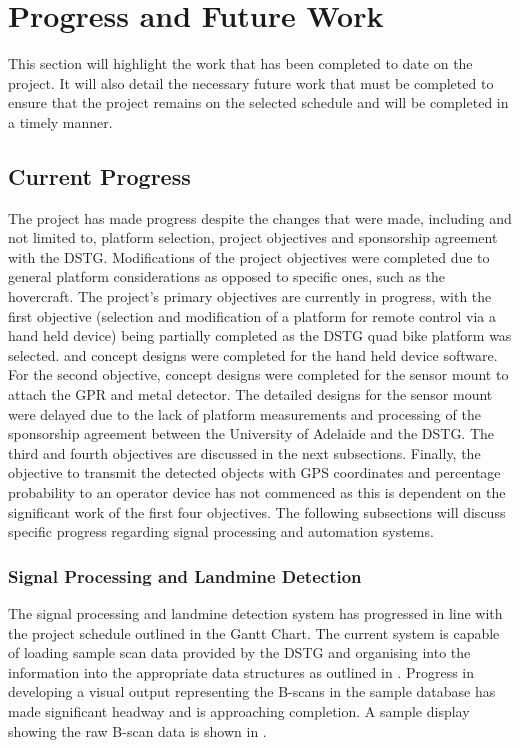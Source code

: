 \documentclass[main.tex]{subfiles}
\begin{document}
\chapter{Progress and Future Work}
This section will highlight the work that has been completed to date on the project. It will also detail the necessary future work that must be completed to ensure that the project remains on the selected schedule and will be completed in a timely manner.
\section{Current Progress}
The project has made progress despite the changes that were made, including and not limited to, platform selection, project objectives and sponsorship agreement with the DSTG. Modifications of the project objectives were completed due to general platform considerations as opposed to specific ones, such as the hovercraft. The project's primary objectives are currently in progress, with the first objective (selection and modification of a platform for remote control via a hand held device) being partially completed as the DSTG quad bike platform was selected. and concept designs were completed for the hand held device software. For the second objective, concept designs were completed for the sensor mount to attach the GPR and metal detector. The detailed designs for the sensor mount were delayed due to the lack of platform measurements and processing of the sponsorship agreement between the University of Adelaide and the DSTG. The third and fourth objectives are discussed in the next subsections. Finally, the objective to transmit the detected objects with GPS coordinates and percentage probability to an operator device has not commenced as this is dependent on the significant work of the first four objectives. The following subsections will discuss specific progress regarding signal processing and automation systems.

\subsection{Signal Processing and Landmine Detection}
The signal processing and landmine detection system has progressed in line with the project schedule outlined in the Gantt Chart. The current system is capable of loading sample scan data provided by the DSTG and organising into the information into the appropriate data structures as outlined in . 
Progress in developing a visual output representing the B-scans in the sample database has made significant headway and is approaching completion. A sample display showing the raw B-scan data is shown in .
\end{document}
